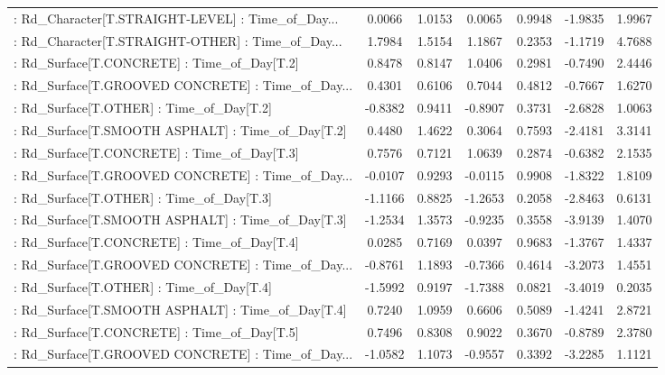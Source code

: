 \begin{longtable}{p{4cm}cccccc}
 : Rd\_Character[T.STRAIGHT-LEVEL] : Time\_of\_Day... &  0.0066 &    1.0153 &  0.0065 &       0.9948 & -1.9835 &  1.9967 \\
 : Rd\_Character[T.STRAIGHT-OTHER] : Time\_of\_Day... &  1.7984 &    1.5154 &  1.1867 &       0.2353 & -1.1719 &  4.7688 \\
 : Rd\_Surface[T.CONCRETE] : Time\_of\_Day[T.2]       &  0.8478 &    0.8147 &  1.0406 &       0.2981 & -0.7490 &  2.4446 \\
 : Rd\_Surface[T.GROOVED CONCRETE] : Time\_of\_Day... &  0.4301 &    0.6106 &  0.7044 &       0.4812 & -0.7667 &  1.6270 \\
 : Rd\_Surface[T.OTHER] : Time\_of\_Day[T.2]          & -0.8382 &    0.9411 & -0.8907 &       0.3731 & -2.6828 &  1.0063 \\
 : Rd\_Surface[T.SMOOTH ASPHALT] : Time\_of\_Day[T.2] &  0.4480 &    1.4622 &  0.3064 &       0.7593 & -2.4181 &  3.3141 \\
 : Rd\_Surface[T.CONCRETE] : Time\_of\_Day[T.3]       &  0.7576 &    0.7121 &  1.0639 &       0.2874 & -0.6382 &  2.1535 \\
 : Rd\_Surface[T.GROOVED CONCRETE] : Time\_of\_Day... & -0.0107 &    0.9293 & -0.0115 &       0.9908 & -1.8322 &  1.8109 \\
 : Rd\_Surface[T.OTHER] : Time\_of\_Day[T.3]          & -1.1166 &    0.8825 & -1.2653 &       0.2058 & -2.8463 &  0.6131 \\
 : Rd\_Surface[T.SMOOTH ASPHALT] : Time\_of\_Day[T.3] & -1.2534 &    1.3573 & -0.9235 &       0.3558 & -3.9139 &  1.4070 \\
 : Rd\_Surface[T.CONCRETE] : Time\_of\_Day[T.4]       &  0.0285 &    0.7169 &  0.0397 &       0.9683 & -1.3767 &  1.4337 \\
 : Rd\_Surface[T.GROOVED CONCRETE] : Time\_of\_Day... & -0.8761 &    1.1893 & -0.7366 &       0.4614 & -3.2073 &  1.4551 \\
 : Rd\_Surface[T.OTHER] : Time\_of\_Day[T.4]          & -1.5992 &    0.9197 & -1.7388 &       0.0821 & -3.4019 &  0.2035 \\
 : Rd\_Surface[T.SMOOTH ASPHALT] : Time\_of\_Day[T.4] &  0.7240 &    1.0959 &  0.6606 &       0.5089 & -1.4241 &  2.8721 \\
 : Rd\_Surface[T.CONCRETE] : Time\_of\_Day[T.5]       &  0.7496 &    0.8308 &  0.9022 &       0.3670 & -0.8789 &  2.3780 \\
 : Rd\_Surface[T.GROOVED CONCRETE] : Time\_of\_Day... & -1.0582 &    1.1073 & -0.9557 &       0.3392 & -3.2285 &  1.1121 \\

\end{longtable}
